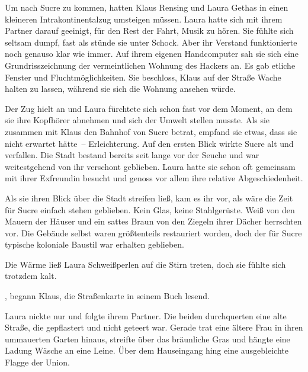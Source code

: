 Um nach Sucre zu kommen, hatten Klaus Rensing und Laura Gethas in einen kleineren Intrakontinentalzug umsteigen müssen. Laura hatte sich mit ihrem Partner darauf geeinigt, für den Rest der Fahrt, Musik zu hören. Sie fühlte sich seltsam dumpf, fast als stünde sie unter Schock. Aber ihr Verstand funktionierte noch genauso klar wie immer. Auf ihrem eigenen Handcomputer sah sie sich eine Grundrisszeichnung der vermeintlichen Wohnung des Hackers an. Es gab etliche Fenster und Fluchtmöglichkeiten. Sie beschloss, Klaus auf der Straße Wache halten zu lassen, während sie sich die Wohnung ansehen würde.

\par

Der Zug hielt an und Laura fürchtete sich schon fast vor dem Moment, an dem sie ihre Kopfhörer abnehmen und sich der Umwelt stellen musste. Als sie zusammen mit Klaus den Bahnhof von Sucre betrat, empfand sie etwas, dass sie nicht erwartet hätte~-- Erleichterung. Auf den ersten Blick wirkte Sucre alt und verfallen. Die Stadt bestand bereits seit lange vor der Seuche und war weitestgehend von ihr verschont geblieben. Laura hatte sie schon oft gemeinsam mit ihrer Exfreundin besucht und genoss vor allem ihre relative Abgeschiedenheit.

\par

Als sie ihren Blick über die Stadt streifen ließ, kam es ihr vor, als wäre die Zeit für Sucre einfach stehen geblieben. Kein Glas, keine Stahlgerüste. Weiß von den Mauern der Häuser und ein sattes Braun von den Ziegeln ihrer Dächer herrschten vor. Die Gebäude selbst waren größtenteils restauriert worden, doch der für Sucre typische koloniale Baustil war erhalten geblieben.

\par

Die Wärme ließ Laura Schweißperlen auf die Stirn treten, doch sie fühlte sich trotzdem kalt.

\par

, begann Klaus, die Straßenkarte in seinem Buch lesend. 

\par

Laura nickte nur und folgte ihrem Partner. Die beiden durchquerten eine alte Straße, die gepflastert und nicht geteert war. Gerade trat eine ältere Frau in ihren ummauerten Garten hinaus, streifte über das bräunliche Gras und hängte eine Ladung Wäsche an eine Leine. Über dem Hauseingang hing eine ausgebleichte Flagge der Union.

